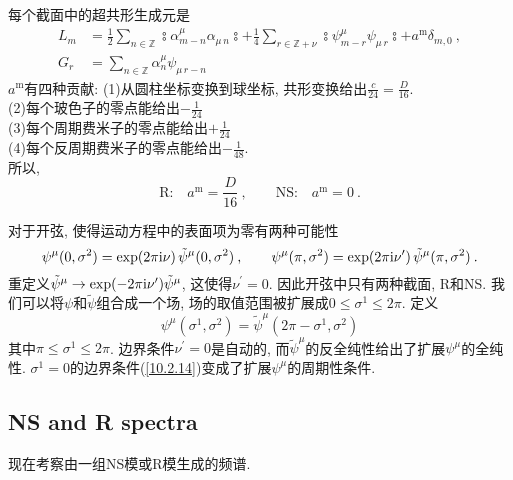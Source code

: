 每个截面中的超共形生成元是
\begin{subequations}
\begin{align}
    L_{m}&=\frac{1}{2}\sum_{n\in\mathds{Z}}\typecolon \alpha_{m-n}^{\mu}\alpha_{\mu\,n}\!\typecolon
    +\frac{1}{4}\sum_{r\in\mathds{Z}+\nu}\typecolon\psi^{\mu}_{m-r}\psi_{\mu\,r}\!\typecolon+a^{\mathrm{m}}\delta_{m,0}\:, \label{10.2.12a} \\
    G_{r}&=\sum_{n\in\mathds{Z}}\alpha_{n}^{\mu}\psi_{\mu\,r-n} \label{10.2.12b}
\end{align}
\end{subequations}
$a^{\mathrm{m}}$有四种贡献:
(1)从圆柱坐标变换到球坐标, 共形变换给出$\frac{c}{24}=\frac{D}{16}$. \\
(2)每个玻色子的零点能给出$ -\frac{1}{24} $ \\
(3)每个周期费米子的零点能给出$ +\frac{1}{24} $ \\
(4)每个反周期费米子的零点能给出$ -\frac{1}{48} $. \\
所以,
\begin{equation}
    \text{R:}\quad a^{\mathrm{m}}=\frac{D}{16}\:,\qquad
    \text{NS:}\quad a^{\mathrm{m}}=0 \:. \label{10.2.13}
\end{equation}

对于开弦, 使得运动方程中的表面项为零有两种可能性
\begin{equation}
    \psi^{\mu}(0,\sigma^{2})=\exp(2\pi\mathrm{i}\nu)\,\tilde{\psi}^{\mu}(0,\sigma^{2}) \:, \qquad
    \psi^{\mu}(\pi,\sigma^{2})=\exp(2\pi\mathrm{i}\nu^{\prime})\,\tilde{\psi}^{\mu}(\pi,\sigma^{2}) \:. \label{10.2.14} 
\end{equation}
重定义$ \tilde{\psi}^{\mu}\to\exp(-2\pi\mathrm{i}\nu^{\prime})\tilde{\psi}^{\mu}$, 这使得$ \nu^{\prime}=0$. 因此开弦中只有两种截面, R和NS. 我们可以将$ \psi $和$ \tilde{\psi} $组合成一个场, 场的取值范围被扩展成$ 0\leq\sigma^{1}\leq 2\pi$. 定义
\begin{equation}
    \psi^{\mu}(\sigma^{1},\sigma^{2})=\tilde{\psi}^{\mu}(2\pi-\sigma^{1},\sigma^{2})\label{10.2.15} 
\end{equation}
其中$ \pi\leq\sigma^{1}\leq 2\pi$. 边界条件$ \nu^{\prime}=0$是自动的, 而$ \tilde{\psi}^{\mu} $的反全纯性给出了扩展$\psi^{\mu}$的全纯性. $\sigma^{1}=0 $的边界条件(\ref{10.2.14})变成了扩展$\psi^{\mu}$的周期性条件.

\subsection*{NS and R spectra}
现在考察由一组NS模或R模生成的频谱. 

